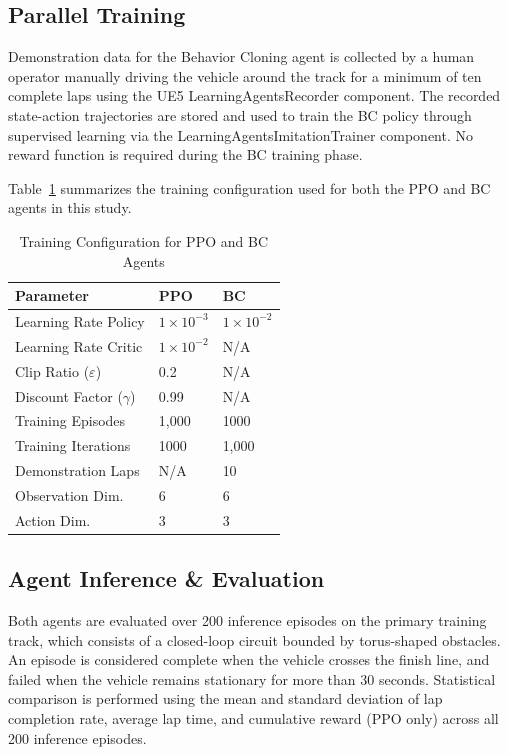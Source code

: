 \documentclass[conference]{IEEEtran}
\begin{document}
\subsection{Parallel Training}
Demonstration data for the Behavior Cloning agent is collected by a human operator manually driving the vehicle around the track for a minimum of ten complete laps using the UE5 LearningAgentsRecorder component. The recorded state-action trajectories are stored and used to train the BC policy through supervised learning via the LearningAgentsImitationTrainer component. No reward function is required during the BC training phase. 

Table~\ref{tab:training} summarizes the training configuration used for both the PPO and BC agents in this study.

\begin{table}[h] 
\centering \caption{Training Configuration for PPO and BC Agents} \label{tab:training} \renewcommand{\arraystretch}{1.2} \begin{tabular}{|p{2.8cm}|p{2cm}|p{2cm}|} \hline Parameter & PPO & BC \\ \hline Learning Rate Policy & $1 \times 10^{-3}$ & $1 \times 10^{-2}$ \\ \hline Learning Rate Critic & $1 \times 10^{-2}$ & N/A \\ \hline Clip Ratio ($\varepsilon$) & 0.2 & N/A \\ \hline Discount Factor ($\gamma$) & 0.99 & N/A \\ \hline Training Episodes & 1,000 & 1000 \\ \hline Training Iterations & 1000 & 1,000 \\ \hline Demonstration Laps & N/A & 10 \\ \hline Observation Dim. & 6 & 6 \\ \hline Action Dim. & 3 & 3 \\ \hline \end{tabular} \end{table}

\subsection{Agent Inference \& Evaluation}
Both agents are evaluated over 200 inference episodes on 
the primary training track, which consists of a closed-loop 
circuit bounded by torus-shaped obstacles. An episode is 
considered complete when the vehicle crosses the finish line, 
and failed when the vehicle remains stationary for more than 
30 seconds. Statistical comparison is performed using the 
mean and standard deviation of lap completion rate, average 
lap time, and cumulative reward (PPO only) across all 200 
inference episodes.
\end{document}

